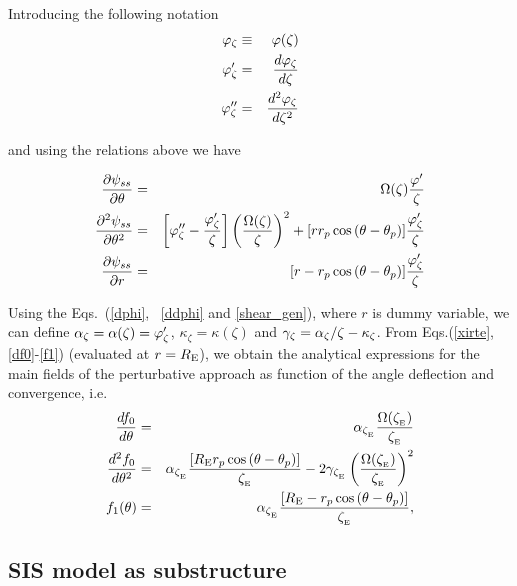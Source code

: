 Introducing the following notation
\begin{eqnarray}
\varphi_\zeta & \equiv & \varphi(\zeta) \nonumber \\
\varphi^\prime_\zeta &=& d\varphi_\zeta \over d\zeta \nonumber  \\
\varphi^{\prime\prime}_\zeta &=& d^2\varphi_\zeta \over d\zeta^2 \nonumber 
\end{eqnarray}

and using the relations above we have

\begin{eqnarray}
\dfrac{\prtl \psi_{ss}}{\prtl
\te}&=&\Omega(\zeta)\dfrac{\varphi^\prime}{\zeta}\label{df0}\\
\dfrac{\prtl^2
\psi_{ss}}{\prtl\te^2}&=&\left[\varphi^{\prime\prime}_\zeta-\dfrac{
\varphi^\prime_\zeta}{\zeta}\right]%
\left(\dfrac{\Omega(\zeta)}{\zeta}\right)^2+[r
r_p\cos{(\te-\tep)}]\dfrac{\varphi^\prime_\zeta}{\zeta}\label{ddf0}\\
\dfrac{\prtl \psi_{ss}}{\prtl
r}&=&[r-r_p\cos{(\te-\tep)}]\dfrac{\varphi^\prime_\zeta}{\zeta}\label{f1}
\end{eqnarray}

Using the Eqs.~(\ref{dphi}, \, \ref{ddphi} and \ref{shear_gen}), where $r$ is
dummy variable, we can define 
$\alpha_\zeta=\alpha(\zeta)=\varphi^\prime_\zeta$, $\kappa_\zeta=\kappa(\zeta)$ and
$\gamma_\zeta=\alpha_\zeta/\zeta-\kappa_\zeta$. 
From Eqs.(\ref{xirte}, \ref{df0}-\ref{f1}) (evaluated at $r=R_{\mathrm{E}}$), we obtain the
analytical expressions for the main fields of
the perturbative approach as function of the angle deflection and convergence,
i.e.
\begin{eqnarray}
\dfrac{df_0}{d\te}&=&\al_{\xie}\dfrac{\Omega(\xie)}{\xie}\\
\dfrac{d^2f_0}{d\te^2}&=& \al_{\xie}\dfrac{[\re r_p\cos{(\te-\tep)}]}{\xie}%
- 2\gamma_{\xie} \left(\dfrac{\Omega(\xie)}{\xie}\right)^2\\
f_1(\te)&=&\al_{\xie}\dfrac{[\re-r_p\cos{(\te-\tep)}]}{\xie},
\end{eqnarray}

\subsection{SIS model as substructure}

